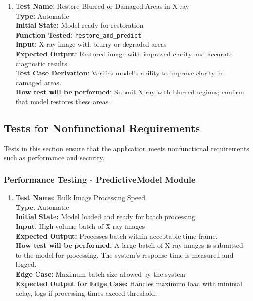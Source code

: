 \documentclass[12pt, titlepage]{article}
\begin{document}
\begin{enumerate}
  \item \textbf{Test Name:}  Restore Blurred or Damaged Areas in X-ray\\
    \textbf{Type:}  Automatic\\
    \textbf{Initial State:}  Model ready for restoration\\
    \textbf{Function Tested:}  \verb|restore_and_predict|\\
    \textbf{Input:}  X-ray image with blurry or degraded areas\\
    \textbf{Expected Output:}  Restored image with improved clarity and accurate diagnostic results\\
    \textbf{Test Case Derivation:}  Verifies model’s ability to improve clarity in damaged areas.\\
    \textbf{How test will be performed:}  Submit X-ray with blurred regions; confirm that model restores these areas.\\
\end{enumerate}

\subsection{Tests for Nonfunctional Requirements}

Tests in this section ensure that the application meets nonfunctional requirements such as performance and security.

\subsubsection{Performance Testing - PredictiveModel Module}
\begin{enumerate}
  \item \textbf{Test Name:}  Bulk Image Processing Speed\\
    \textbf{Type:}  Automatic\\
    \textbf{Initial State:}  Model loaded and ready for batch processing\\
    \textbf{Input:}  High volume batch of X-ray images\\
    \textbf{Expected Output:}  Processes batch within acceptable time frame.\\
    \textbf{How test will be performed:}  A large batch of X-ray images is submitted to the model for processing. The system’s response time is measured and logged.\\
    \textbf{Edge Case:}  Maximum batch size allowed by the system\\
    \textbf{Expected Output for Edge Case:}  Handles maximum load with minimal delay, logs if processing times exceed threshold.\\
\end{enumerate}
\end{document}
